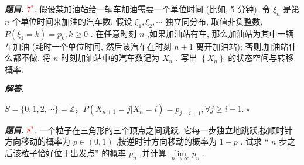 \documentclass[10pt, a4paper, oneside]{ctexart}
\newenvironment{problem}{\begin{framed}\par\noindent\textbf{\textit{题目. }}}{\end{framed}\par}
\newenvironment{solution}{%
  \par\noindent\textbf{\textit{解答. }}\ignorespaces
}{%
  \hfill\ensuremath{\square}\par %
}
\begin{document}
\begin{problem}
\textcolor{red}{7$^*$}. 假设某加油站给一辆车加油需要一个单位时间 (比如, 5 分钟). 令 \( {\xi }_{n} \) 是第 \( n \) 个单位时间来加油的汽车数. 假设 \( {\xi }_{1},{\xi }_{2},\cdots \) 独立同分布, 取值非负整数, \( P\left( {{\xi }_{1} = k}\right) = {p}_{k},k \geq 0 \) . 在任意时刻 \( n \) ,如果加油站有车, 那么加油站为其中一辆车加油 (耗时一个单位时间, 然后该汽车在时刻 \( n + 1 \) 离开加油站); 否则,加油站什么都不做. 将 \( n \) 时刻加油站中的汽车数记为 \( {X}_{n} \) . 写出 \( \left\{ {X}_{n}\right\} \) 的状态空间与转移概率.
\end{problem}
\begin{solution}
$S=\{0,1,2,\cdots\}=\mathbb{Z}$，$P(X_{n+1}=j|X_n=i)=p_{j-i+1}, \forall j\geq i-1$.
\end{solution}

\begin{problem}
    \textcolor{red}{8$^*$}. 一个粒子在三角形的三个顶点之间跳跃. 它每一步独立地跳跃,按顺时针方向移动的概率为 \( p \in \left( {0,1}\right) \) ,按逆时针方向移动的概率为 \( 1 - p \) . 试求 “ \( n \) 步之后该粒子恰好位于出发点” 的概率 \( {p}_{n} \) ,并计算 \( \mathop{\lim }\limits_{{n \rightarrow \infty }}{p}_{n} \) .
\end{problem}
\end{document}
